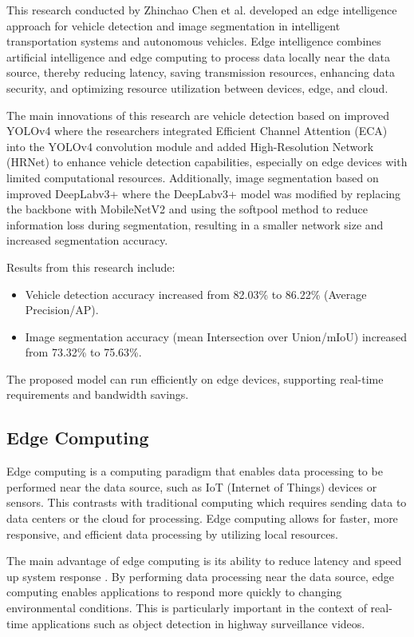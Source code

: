 This research conducted by Zhinchao Chen et al. \cite{Chen2023Edge} developed an edge intelligence approach for vehicle detection and image segmentation in intelligent transportation systems and autonomous vehicles. Edge intelligence combines artificial intelligence and edge computing to process data locally near the data source, thereby reducing latency, saving transmission resources, enhancing data security, and optimizing resource utilization between devices, edge, and cloud.

The main innovations of this research are vehicle detection based on improved YOLOv4 where the researchers integrated Efficient Channel Attention (ECA) into the YOLOv4 convolution module and added High-Resolution Network (HRNet) to enhance vehicle detection capabilities, especially on edge devices with limited computational resources. Additionally, image segmentation based on improved DeepLabv3+ where the DeepLabv3+ model was modified by replacing the backbone with MobileNetV2 and using the softpool method to reduce information loss during segmentation, resulting in a smaller network size and increased segmentation accuracy.

Results from this research include:
\begin{itemize}[nolistsep]
  \item Vehicle detection accuracy increased from 82.03\% to 86.22\% (Average Precision/AP).
  \item Image segmentation accuracy (mean Intersection over Union/mIoU) increased from 73.32\% to 75.63\%.
\end{itemize}
The proposed model can run efficiently on edge devices, supporting real-time requirements and bandwidth savings.

\subsection{\textbf{Edge Computing}}

Edge computing is a computing paradigm that enables data processing to be performed near the data source, such as IoT (Internet of Things) devices or sensors. This contrasts with traditional computing which requires sending data to data centers or the cloud for processing. Edge computing allows for faster, more responsive, and efficient data processing by utilizing local resources.

The main advantage of edge computing is its ability to reduce latency and speed up system response \cite{aws2024}. By performing data processing near the data source, edge computing enables applications to respond more quickly to changing environmental conditions. This is particularly important in the context of real-time applications such as object detection in highway surveillance videos.

